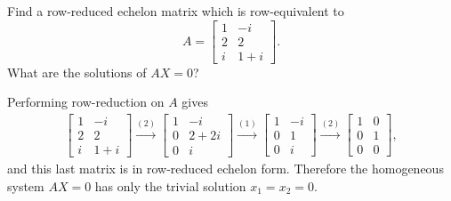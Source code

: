  Find a row-reduced echelon matrix which is row-equivalent
to
\begin{equation*}
  A =
  \begin{bmatrix}
    1 & -i \\
    2 & 2 \\
    i & 1 + i
  \end{bmatrix}.
\end{equation*}
What are the solutions of $AX = 0$?
\begin{solution}
  Performing row-reduction on $A$ gives
  \begin{gather*}
    \begin{bmatrix}
      1 & -i \\
      2 & 2 \\
      i & 1 + i
    \end{bmatrix}
    \xrightarrow{(2)}
    \begin{bmatrix}
      1 & -i \\
      0 & 2 + 2i \\
      0 & i
    \end{bmatrix}
    \xrightarrow{(1)}
    \begin{bmatrix}
      1 & -i \\
      0 & 1 \\
      0 & i
    \end{bmatrix}
    \xrightarrow{(2)}
    \begin{bmatrix}
      1 & 0 \\
      0 & 1 \\
      0 & 0
    \end{bmatrix},
  \end{gather*}
  and this last matrix is in row-reduced echelon form. Therefore the
  homogeneous system $AX = 0$ has only the trivial solution
  $x_1 = x_2 = 0$.
\end{solution}

